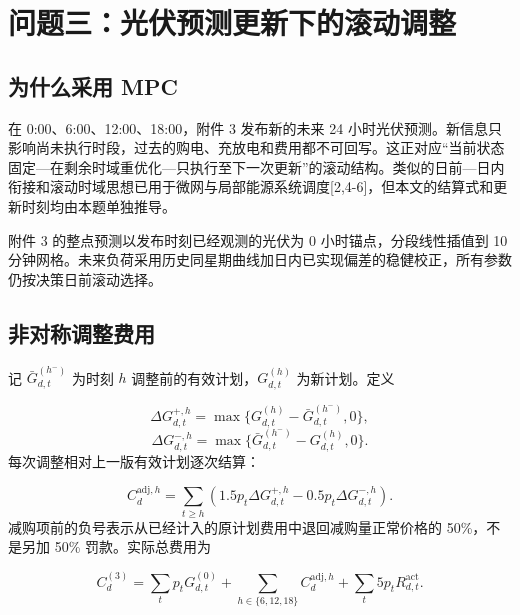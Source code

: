 \documentclass[12pt,a4paper]{ctexart}
\begin{document}
\section{问题三：光伏预测更新下的滚动调整}
\subsection{为什么采用 MPC}
在 0:00、6:00、12:00、18:00，附件 3 发布新的未来 24 小时光伏预测。新信息只影响尚未执行时段，过去的购电、充放电和费用都不可回写。这正对应“当前状态固定—在剩余时域重优化—只执行至下一次更新”的滚动结构。类似的日前—日内衔接和滚动时域思想已用于微网与局部能源系统调度[2,4-6]，但本文的结算式和更新时刻均由本题单独推导。\par
附件 3 的整点预测以发布时刻已经观测的光伏为 0 小时锚点，分段线性插值到 10 分钟网格。未来负荷采用历史同星期曲线加日内已实现偏差的稳健校正，所有参数仍按决策日前滚动选择。\par
\subsection{非对称调整费用}
记 $\bar G^{(h^-)}_{d,t}$ 为时刻 $h$ 调整前的有效计划，$G^{(h)}_{d,t}$ 为新计划。定义\par
\begin{equation}
\Delta G^{+,h}_{d,t}=\max\{G^{(h)}_{d,t}-\bar G^{(h^-)}_{d,t},0\},
\end{equation}
\begin{equation}
\Delta G^{-,h}_{d,t}=\max\{\bar G^{(h^-)}_{d,t}-G^{(h)}_{d,t},0\}.
\tag{14}
\end{equation}
每次调整相对上一版有效计划逐次结算：\par
\begin{equation}
C^{\mathrm{adj},h}_d=\sum_{t\ge h}
\left(1.5p_t\Delta G^{+,h}_{d,t}-0.5p_t\Delta G^{-,h}_{d,t}\right).
\tag{15}
\end{equation}
减购项前的负号表示从已经计入的原计划费用中退回减购量正常价格的 50\%，不是另加 50\% 罚款。实际总费用为\par
\begin{equation}
C^{(3)}_d=\sum_t p_tG^{(0)}_{d,t}
+\sum_{h\in\{6,12,18\}}C^{\mathrm{adj},h}_d
+\sum_t5p_tR^{\mathrm{act}}_{d,t}.
\tag{16}
\end{equation}
\end{document}
